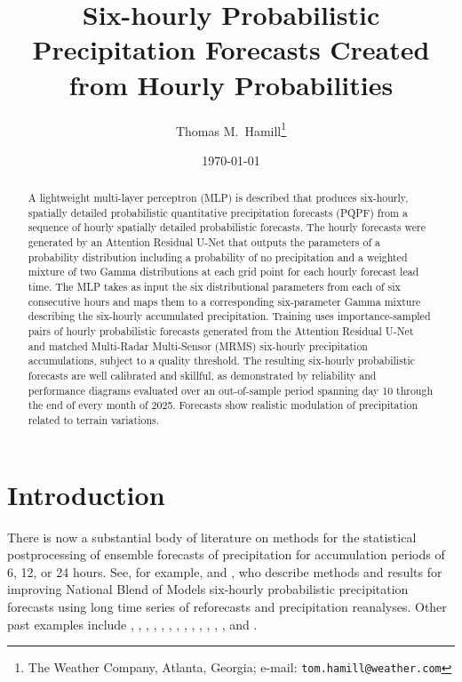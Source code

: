 \documentclass[11pt]{article}
\title{Six-hourly Probabilistic Precipitation Forecasts Created from Hourly Probabilities}
\author{Thomas M.\ Hamill\thanks{The Weather Company, Atlanta,
  Georgia; e-mail: \texttt{tom.hamill@weather.com}}}
\date{\today}
\begin{document}
\maketitle

\begin{abstract}
A lightweight multi-layer perceptron (MLP) is described that produces
six-hourly, spatially detailed probabilistic quantitative precipitation forecasts (PQPF) from
a sequence of hourly spatially detailed probabilistic forecasts.  The hourly forecasts were
generated by an Attention Residual U-Net that outputs the parameters of a
probability distribution including a probability of no precipitation and a weighted 
mixture of two Gamma distributions at each grid point for each hourly
forecast lead time.  The MLP takes as input the six distributional parameters
from each of six consecutive hours and maps them to a corresponding
six-parameter Gamma mixture describing the six-hourly accumulated precipitation.
Training uses importance-sampled pairs of hourly probabilistic forecasts 
generated from the Attention Residual U-Net and
matched Multi-Radar Multi-Sensor (MRMS) six-hourly precipitation
accumulations, subject to a quality threshold.  The resulting six-hourly probabilistic 
forecasts are well calibrated and skillful, as demonstrated by reliability and performance 
diagrams evaluated over an out-of-sample period spanning day 10 through the
end of every month of 2025.
Forecasts show realistic modulation of precipitation related to terrain variations.
\end{abstract}

\section{Introduction}
\label{sec:intro}

There is now a substantial body of literature on methods for the statistical postprocessing of
ensemble forecasts of precipitation for accumulation periods of 6, 12, or 24 hours.  See, for example,
\citet{hamill2023nbm} and \citet{jesberg2023}, who describe methods and results for improving
National Blend of Models six-hourly probabilistic precipitation forecasts using long time series
of reforecasts and precipitation reanalyses.  Other past examples include
\citet{sloughter2007}, \citet{voisin2010}, \citet{bentzien2012}, \citet{bouballegue2013},
\citet{scheuerer2014}, \citet{messner2014}, \citet{scheuerer2015}, \citet{baran2016},
\citet{zhang2017}, \citet{hamill2017nbm}, \citet{hamill2018}, \citet{gascon2019},
\citet{ghazvinian2020}, and \citet{ghazvinian2022}.
\end{document}
